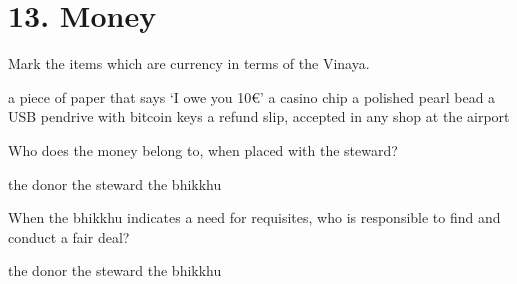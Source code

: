 \chapter{13. Money}
\renewcommand*{\theChapterTitle}{13. Money}

\begin{exam}{\autoExamName}

  \begin{problem}

    Mark the items which are currency in terms of the Vinaya.

    \bigskip

    \begin{manswers}{1}
      \bChoices
       a piece of paper that says `I owe you 10€'\eAns
       a casino chip\eAns
       a polished pearl bead\eAns
       a USB pendrive with bitcoin keys\eAns
       a refund slip, accepted in any shop at the airport\eAns
      \eChoices
    \end{manswers}
    
  \end{problem}

  \problemDivide

  \begin{problem*}

    \begin{parts}

    \item Who does the money belong to, when placed with the steward?

      \bigskip

      \begin{answers}{3}
        \bChoices
         the donor\eAns
         the steward\eAns
         the bhikkhu\eAns
        \eChoices
      \end{answers}

      \bigskip

    \item When the bhikkhu indicates a need for requisites, who is responsible to find and conduct a fair deal?

      \bigskip

      \begin{answers}{3}
        \bChoices
         the donor\eAns
         the steward\eAns
         the bhikkhu\eAns
        \eChoices
      \end{answers}

    \end{parts}


\end{problem*}
\end{exam}
